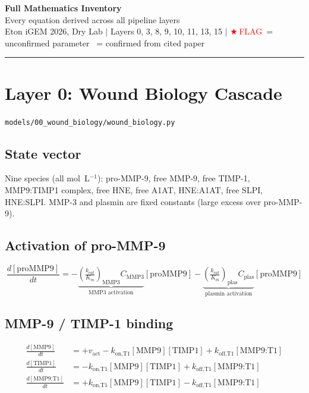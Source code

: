\documentclass[10pt,a4paper]{article}
\numberwithin{equation}{section}
\newcommand{\FLAG}{\textcolor{red}{$\bigstar$\,FLAG}}
\newcommand{\CONF}{\textcolor{teal}{\checkmark}}
\newcommand{\file}[1]{\texttt{\small #1}}
\begin{document}
\begin{center}
{\LARGE\bfseries Full Mathematics Inventory}\\[0.3em]
{\large Every equation derived across all pipeline layers}\\[0.2em]
{\small\color{gray}
Eton iGEM 2026, Dry Lab \quad$|$\quad
Layers 0, 3, 8, 9, 10, 11, 13, 15 \quad$|$\quad
\FLAG\ = unconfirmed parameter \quad
\CONF\ = confirmed from cited paper}
\end{center}
\vspace{0.3em}\hrule\vspace{0.6em}

\section{Layer 0: Wound Biology Cascade}
\file{models/00\_wound\_biology/wound\_biology.py}

\subsection{State vector}

Nine species (all mol~L$^{-1}$): pro-MMP-9, free MMP-9, free TIMP-1,
MMP9:TIMP1 complex, free HNE, free A1AT, HNE:A1AT, free SLPI, HNE:SLPI.
MMP-3 and plasmin are fixed constants (large excess over pro-MMP-9).

\subsection{Activation of pro-MMP-9}

\begin{equation}
  \frac{d[\text{proMMP9}]}{dt}
  = -\underbrace{\left(\tfrac{k_{cat}}{K_m}\right)_{\text{MMP3}}\!C_{\text{MMP3}}}_{\text{MMP3 activation}}
    [\text{proMMP9}]
  - \underbrace{\left(\tfrac{k_{cat}}{K_m}\right)_{\text{plas}}\!C_{\text{plas}}}_{\text{plasmin activation}}
    [\text{proMMP9}]
\end{equation}

\subsection{MMP-9 / TIMP-1 binding}

\begin{align}
  \frac{d[\text{MMP9}]}{dt}    &= +v_{\text{act}} - k_{\text{on,T1}}[\text{MMP9}][\text{TIMP1}] + k_{\text{off,T1}}[\text{MMP9:T1}] \\
  \frac{d[\text{TIMP1}]}{dt}   &= -k_{\text{on,T1}}[\text{MMP9}][\text{TIMP1}] + k_{\text{off,T1}}[\text{MMP9:T1}] \\
  \frac{d[\text{MMP9:T1}]}{dt} &= +k_{\text{on,T1}}[\text{MMP9}][\text{TIMP1}] - k_{\text{off,T1}}[\text{MMP9:T1}]
\end{align}
\end{document}
